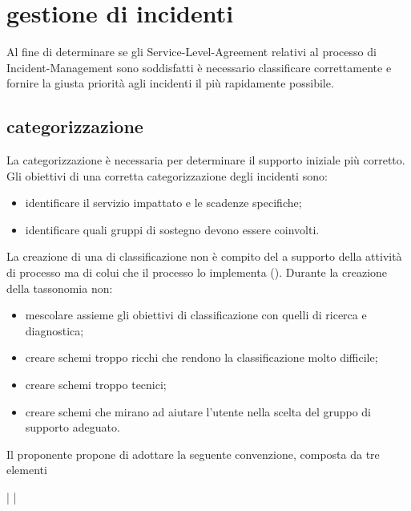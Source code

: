 %
%
\section[Gestione di incidenti]{gestione di incidenti}
\label{im-management}
Al fine di determinare se gli \ac{Service-Level-Agreement} relativi al processo di \ac{Incident-Management} sono soddisfatti è necessario classificare correttamente e fornire la giusta priorità agli incidenti il più rapidamente possibile.

\subsection[Categorizzazione]{categorizzazione}
\label{im-management-classification}
La categorizzazione è necessaria per determinare il supporto iniziale più corretto. Gli obiettivi di una corretta categorizzazione degli incidenti sono:

\begin{itemize}
\item{identificare il servizio impattato e le scadenze specifiche;}
\item{identificare quali gruppi di sostegno devono essere coinvolti.}
\end{itemize}

La creazione di una  di classificazione non è compito del  a supporto della attività di processo ma di colui che il processo lo implementa (). Durante la creazione della tassonomia non:

\begin{itemize}
\item{mescolare assieme gli obiettivi di classificazione con quelli di ricerca e diagnostica;}
\item{creare schemi troppo ricchi che rendono la classificazione molto difficile;}
\item{creare schemi troppo tecnici;}
\item{creare schemi che mirano ad aiutare l'utente nella scelta del gruppo di supporto adeguato.}
\end{itemize}

Il proponente propone di adottare la seguente convenzione, composta da tre elementi

\begin{center}
 |  | 
\end{center}

